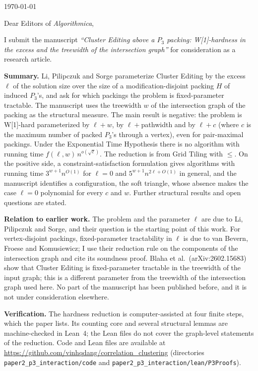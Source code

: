 \documentclass[11pt,a4paper]{article}
\begin{document}
\today

Dear Editors of \emph{Algorithmica},

I submit the manuscript \emph{``Cluster Editing above a $P_3$ packing: W[1]-hardness in the excess and the treewidth of the intersection graph''} for consideration as a research article.

\textbf{Summary.} Li, Pilipczuk and Sorge parameterize Cluster Editing by the excess $\ell$ of the solution size over the size of a modification-disjoint packing $H$ of induced $P_3$'s, and ask for which packings the problem is fixed-parameter tractable. The manuscript uses the treewidth $w$ of the intersection graph of the packing as the structural measure. The main result is negative: the problem is W[1]-hard parameterized by $\ell+w$, by $\ell+{}$pathwidth and by $\ell+c$ (where $c$ is the maximum number of packed $P_3$'s through a vertex), even for pair-maximal packings. Under the Exponential Time Hypothesis there is no algorithm with running time $f(\ell,w)\,n^{o(\sqrt{\ell})}$. The reduction is from Grid Tiling with $\le$. On the positive side, a constraint-satisfaction formulation gives algorithms with running time $3^{w+1}n^{O(1)}$ for $\ell=0$ and $5^{w+1}n^{2\ell+O(1)}$ in general, and the manuscript identifies a configuration, the soft triangle, whose absence makes the case $\ell=0$ polynomial for every $c$ and $w$. Further structural results and open questions are stated.

\textbf{Relation to earlier work.} The problem and the parameter $\ell$ are due to Li, Pilipczuk and Sorge, and their question is the starting point of this work. For vertex-disjoint packings, fixed-parameter tractability in $\ell$ is due to van Bevern, Froese and Komusiewicz; I use their reduction rule on the components of the intersection graph and cite its soundness proof. Blaha et al.\ (arXiv:2602.15683) show that Cluster Editing is fixed-parameter tractable in the treewidth of the input graph; this is a different parameter from the treewidth of the intersection graph used here. No part of the manuscript has been published before, and it is not under consideration elsewhere.

\textbf{Verification.} The hardness reduction is computer-assisted at four finite steps, which the paper lists. Its counting core and several structural lemmas are machine-checked in Lean~4; the Lean files do not cover the graph-level statements of the reduction. Code and Lean files are available at \url{https://github.com/vinhqdang/correlation_clustering} (directories \texttt{paper2\_p3\_interaction/code} and \texttt{paper2\_p3\_interaction/lean/P3Proofs}).
\end{document}
